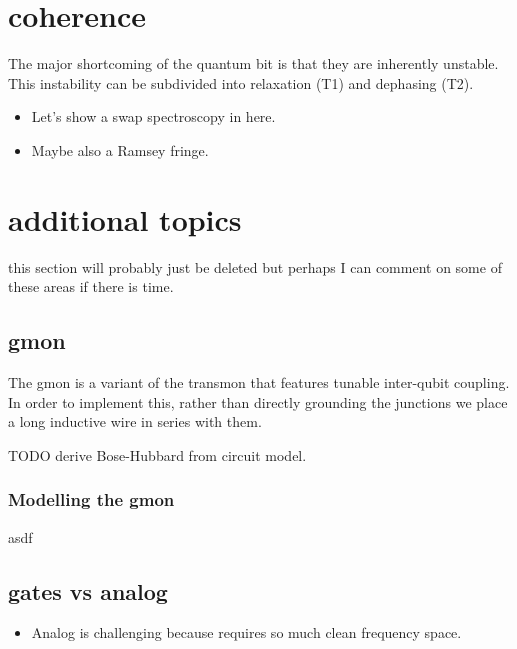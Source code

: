 {\section{coherence}
The major shortcoming of the quantum bit is that they are inherently unstable.
This instability can be subdivided into relaxation (T1) and dephasing (T2).
\begin{itemize}
    \item Let's show a swap spectroscopy in here.
    \item Maybe also a Ramsey fringe.
\end{itemize}

\section{additional topics}
this section will probably just be deleted but perhaps I can comment on some of these areas if there is time.

\subsection{gmon}
The gmon is a variant of the transmon that features tunable inter-qubit coupling.
In order to implement this, rather than directly grounding the junctions we place a long inductive wire in series with them.

TODO derive Bose-Hubbard from circuit model.
\subsubsection{Modelling the gmon}
asdf

\subsection{gates vs analog}

\begin{itemize}
    \item Analog is challenging because requires so much clean frequency space.
\end{itemize}

}%

